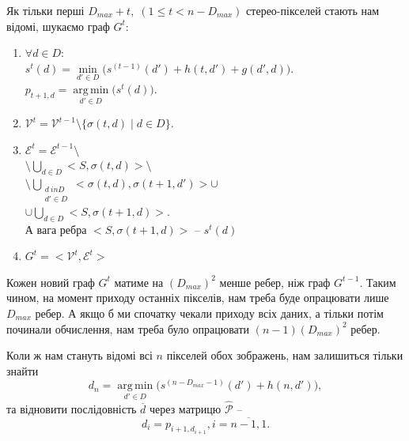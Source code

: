 \documentclass{ConfFTI}
\DeclareMathOperator*{\argmin}{arg\,min}
\begin{document}
Як тільки перші $D_{max} + t, \; ( 1 \leq t < n - D_{max})$ стерео-пікселей стають нам відомі, шукаємо граф $G^t$:
\begin{enumerate}
	\item 
		$\forall d \in D :$\\
		$s^t(d) = \min\limits_{d' \in D} \big( s^{(t-1)}(d') + h(t, d') + g(d', d) \big).$\\
		$p_{t+1,d} = \argmin\limits_{d' \in D}{\big( s^t(d) \big) }$.
	\item 
		$\mathcal{V}^t = \mathcal{V}^{t-1} \setminus \{ \sigma(t, d) \; | \; d \in D \}.$
	\item %
		$\mathcal{E}^t = \mathcal{E}^{t-1} \setminus$\\
		$\setminus \bigcup\limits_{d \in D} <S, \sigma(t, d) > \setminus $\\
		$\setminus \bigcup\limits_{\substack{d \ in D \\ d' \in D}} <\sigma(t, d), \sigma(t+1, d') > \cup $\\
		$\cup \bigcup\limits_{d \in D} <S, \sigma(t+1, d) >.$\\
		А вага ребра $ <S, \sigma(t+1, d) >$ -- $ s^t(d)$ %
	\item 
		$G^t = <\mathcal{V}^t, \mathcal{E}^t> $ 
\end{enumerate}



Кожен новий граф $G^t$ матиме на $(D_{max})^2$ менше ребер, ніж граф $G^{t-1}$. Таким чином, на момент приходу останніх пікселів, нам треба буде опрацювати лише $D_{max}$ ребер. А якщо б ми спочатку чекали приходу всіх даних, а тільки потім починали обчислення, нам треба було опрацювати 
$(n-1)(D_{max})^2$ ребер.

Коли ж нам стануть відомі всі $n$ пікселей обох зображень, нам залишиться тільки знайти
$$ d_n = \argmin\limits_{d' \in D} \big( s^{(n-D_{max}-1)}(d') + h(n, d') \big),$$
та відновити послідовність $\overline{d}$ через матрицю $\hat{\mathcal{P}}$ --
$$ d_i = p_{i+1,d_{i+1}}, i = \overline{n-1, 1}. $$



\end{document}
